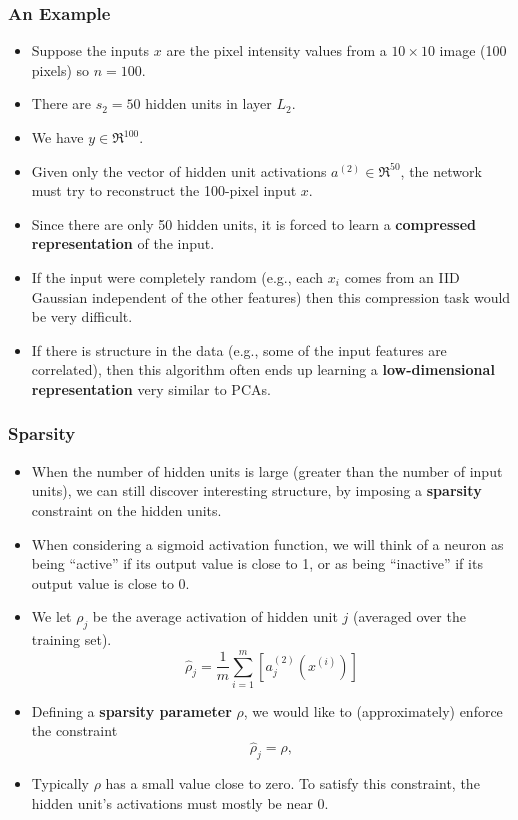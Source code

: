 \documentclass{beamer}
\newcommand{\beq}[1]{\vspace{-0.02in}\begin{equation}#1\end{equation}\vspace{-0.02in}}
\begin{document}
\begin{frame}
\frametitle{An Example}
\begin{itemize}
\item Suppose the inputs $x$ are the pixel intensity values from a $10 \times 10$ image (100 pixels) so $n=100$.
\item There are $s_2=50$ hidden units in layer $L_2$. 
\item We have $y\in \Re^{100}$.
\item Given only the vector of hidden unit activations $a^{(2)} \in \Re^{50}$, the network must try to reconstruct the 100-pixel input $x$. 
\item Since there are only 50 hidden units, it is forced to learn a \textbf{compressed representation} of the input.  
\item If the input were completely random (e.g., each $x_i$ comes from an IID Gaussian independent of the other features) then this compression task would be very difficult.
\item If there is structure in the data (e.g., some of the input features are correlated),  then this algorithm often ends up learning a \textbf{low-dimensional representation} very similar to PCAs.
\end{itemize}
\end{frame}

\begin{frame}
\frametitle{Sparsity}
\begin{itemize}
\item When the number of hidden units is large (greater than the number of input units), we can still discover interesting structure, by imposing a \textbf{sparsity} constraint on the hidden units. 
\item When considering a sigmoid activation function, we will think of a neuron as being ``active'' if its output value is close to 1, or as being ``inactive'' if its output value is close to 0.
\item We let $\rho_j$ be the average activation of hidden unit $j$ (averaged over the training set).
\beq{
\hat\rho_j = \frac{1}{m} \sum_{i=1}^m \left[ a^{(2)}_j(x^{(i)}) \right]
}
\item Defining a \textbf{sparsity parameter} $\rho$, we would like to (approximately) enforce the constraint
\beq{
\hat\rho_j = \rho,
}
\item Typically $\rho$ has a small value close to zero. To satisfy this constraint, the hidden unit's activations must mostly be near 0.

\end{itemize}
\end{frame}
\end{document}
